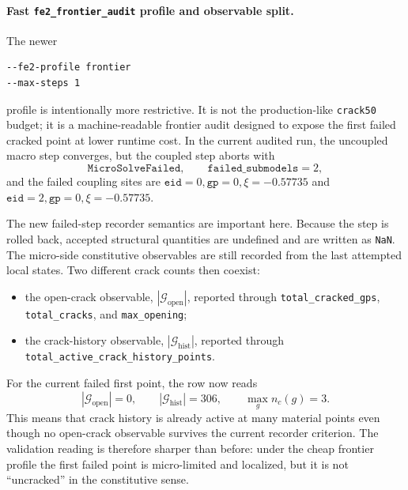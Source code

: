\paragraph{Fast \texttt{fe2\_frontier\_audit} profile and observable split.}
The newer
\begin{verbatim}
--fe2-profile frontier
--max-steps 1
\end{verbatim}
profile is intentionally more restrictive.  It is not the production-like
\texttt{crack50} budget; it is a machine-readable frontier audit designed to
expose the first failed cracked point at lower runtime cost.  In the current
audited run, the uncoupled macro step converges, but the coupled step aborts
with
\begin{equation}
  \texttt{MicroSolveFailed},
  \qquad
  \texttt{failed\_submodels}=2,
  \label{eq:case5-frontier-audit-micro-failure}
\end{equation}
and the failed coupling sites are
\(\texttt{eid}=0,\texttt{gp}=0,\xi=-0.57735\) and
\(\texttt{eid}=2,\texttt{gp}=0,\xi=-0.57735\).

The new failed-step recorder semantics are important here.  Because the step
is rolled back, accepted structural quantities are undefined and are written as
\texttt{NaN}.  The micro-side constitutive observables are still recorded from
the last attempted local states.  Two different crack counts then coexist:
\begin{itemize}
  \item the open-crack observable,
    \(\left|\mathcal{G}_{\mathrm{open}}\right|\), reported through
    \texttt{total\_cracked\_gps}, \texttt{total\_cracks}, and
    \texttt{max\_opening};
  \item the crack-history observable,
    \(\left|\mathcal{G}_{\mathrm{hist}}\right|\), reported through
    \texttt{total\_active\_crack\_history\_points}.
\end{itemize}
For the current failed first point, the row now reads
\begin{equation}
  \left|\mathcal{G}_{\mathrm{open}}\right| = 0,
  \qquad
  \left|\mathcal{G}_{\mathrm{hist}}\right| = 306,
  \qquad
  \max_g n_c(g) = 3.
  \label{eq:case5-frontier-audit-observables}
\end{equation}
This means that crack history is already active at many material points even
though no open-crack observable survives the current recorder criterion.  The
validation reading is therefore sharper than before: under the cheap frontier
profile the first failed point is micro-limited and localized, but it is not
``uncracked'' in the constitutive sense.

